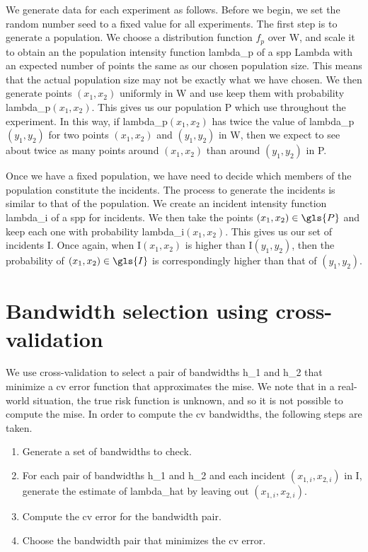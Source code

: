 We generate data for each experiment as follows.
Before we begin, we set the random number seed to a fixed value for all experiments.
The first step is to generate a population.
We choose a distribution function \(f_p\) over \gls{W}, and scale it to obtain an the population intensity function \gls{lambda_p} of a \gls{spp} \gls{Lambda} with an expected number of points the same as our chosen population size.
This means that the actual population size may not be exactly what we have chosen.
We then generate points \((x_1, x_2)\) uniformly in \gls{W} and use keep them with probability \gls{lambda_p}\((x_1, x_2)\).
This gives us our population \gls{P} which use throughout the experiment.
In this way,
if \gls{lambda_p}\((x_1, x_2)\) has twice the value of \gls{lambda_p}\((y_1, y_2)\) for two points \((x_1, x_2)\) and \((y_1, y_2)\) in \gls{W},
then we expect to see about twice as many points around \((x_1, x_2)\) than around \((y_1, y_2)\) in \gls{P}.

Once we have a fixed population, we have need to decide which members of the population constitute the incidents.
The process to generate the incidents is similar to that of the population.
We create an incident intensity function \gls{lambda_i} of a \gls{spp} for incidents.
We then take the points \((x_1, x_2) \in \gls{P}\) and keep each one with probability \gls{lambda_i}\((x_1, x_2)\).
This gives us our set of incidents \gls{I}.
Once again, when \gls{I}\((x_1, x_2)\) is higher than \gls{I}\((y_1, y_2)\),
then the probability of \((x_1, x_2) \in \gls{I}\) is correspondingly higher than that of \((y_1, y_2)\).

\section{Bandwidth selection using cross-validation}
\label{sec:method:cross-validation}

We use cross-validation to select a pair of bandwidths \gls{h_1} and \gls{h_2} that minimize a \gls{cv} error function that approximates the \gls{mise}.
We note that in a real-world situation, the true risk function is unknown, and so it is not possible to compute the \gls{mise}.
In order to compute the \gls{cv} bandwidths, the following steps are taken.
\begin{enumerate}
    \item Generate a set of bandwidths to check.
    \item For each pair of bandwidths \gls{h_1} and \gls{h_2} and each incident \((x_{1,i}, x_{2,i})\) in \gls{I}, generate the estimate of \gls{lambda_hat} by leaving out \((x_{1,i}, x_{2,i})\).
    \item Compute the \gls{cv} error for the bandwidth pair.
    \item Choose the bandwidth pair that minimizes the \gls{cv} error.
\end{enumerate}


